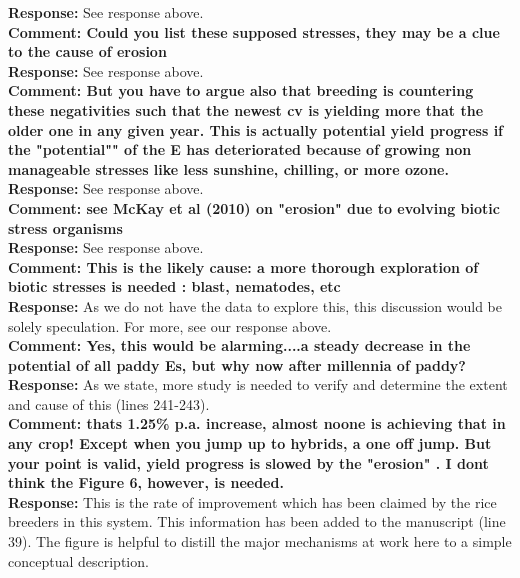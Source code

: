 \documentclass{article} \usepackage[margin=1in]{geometry}
\begin{document}
\textbf{Response: } See response above.\\

\textbf{Comment: Could you list these supposed stresses, they may be a
  clue to the cause of erosion}\\

\textbf{Response: } See response above.\\

\textbf{Comment: But you have to argue also that breeding is
  countering these negativities such that the newest cv is yielding
  more that the older one in any given year. This is actually
  potential yield progress if the "potential"" of the E has
  deteriorated because of growing non manageable stresses like less
  sunshine, chilling, or more ozone.}\\

\textbf{Response: } See response above.\\

\textbf{Comment: see McKay et al (2010) on "erosion" due to evolving
  biotic stress organisms}\\

\textbf{Response: } See response above.\\

\textbf{Comment: This is the likely cause: a more thorough exploration
  of biotic stresses is needed : blast, nematodes, etc}\\

\textbf{Response: } As we do not have the data to explore this, this
discussion would be solely speculation. For more, see our response
above.\\

\textbf{Comment: Yes, this would be alarming....a steady decrease in
  the potential of all paddy Es, but why now after millennia of
  paddy?}\\

\textbf{Response: } As we state, more study is needed to verify and
determine the extent and cause of this (lines 241-243).\\

\textbf{Comment: thats 1.25\% p.a. increase, almost noone is achieving
  that in any crop! Except when you jump up to hybrids, a one off
  jump. But your point is valid, yield progress is slowed by the
  "erosion" . I dont think the Figure 6, however, is needed.}\\

\textbf{Response: } This is the rate of improvement which has been
claimed by the rice breeders in this system. This information has been
added to the manuscript (line 39). The figure is helpful to distill
the major mechanisms at work here to a simple conceptual
description.\\
\end{document}
